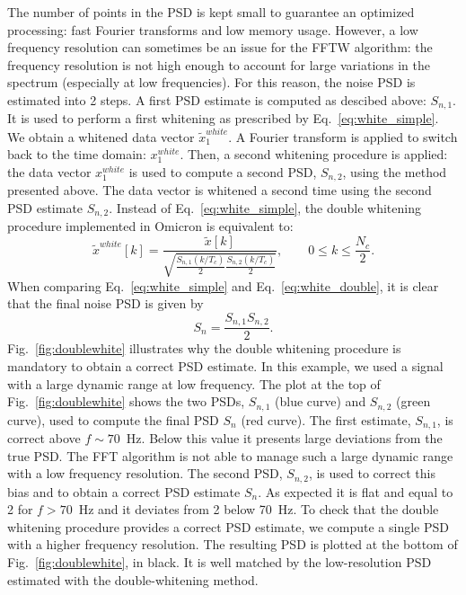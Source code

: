 The number of points in the PSD is kept small to guarantee an optimized processing: fast Fourier transforms and low memory usage. However, a low frequency resolution can sometimes be an issue for the FFTW algorithm: the frequency resolution is not high enough to account for large variations in the spectrum (especially at low frequencies). For this reason, the noise PSD is estimated into 2 steps. A first PSD estimate is computed as descibed above: $S_{n,1}$. It is used to perform a first whitening as prescribed by Eq.~\ref{eq:white_simple}. We obtain a whitened data vector $\tilde{x}_1^{white}$. A Fourier transform is applied to switch back to the time domain: $x_1^{white}$. Then, a second whitening procedure is applied: the data vector $x_1^{white}$ is used to compute a second PSD, $S_{n,2}$, using the method presented above. The data vector is whitened a second time using the second PSD estimate $S_{n,2}$. Instead of Eq.~\ref{eq:white_simple}, the double whitening procedure implemented in Omicron is equivalent to:
\begin{equation}
  \tilde{x}^{white}[k] = \frac{\tilde{x}[k]}{\sqrt{\frac{S_{n,1}(k/T_c)}{2}\frac{S_{n,2}(k/T_c)}{2}}}, \qquad 0 \le k \le \frac{N_c}{2}.
  \label{eq:white_double}
\end{equation}
When comparing Eq.~\ref{eq:white_simple} and Eq.~\ref{eq:white_double}, it is clear that the final noise PSD is given by
\begin{equation}
  S_n = \frac{S_{n,1}S_{n,2}}{2}.
\end{equation}
Fig.~\ref{fig:doublewhite} illustrates why the double whitening procedure is mandatory to obtain a correct PSD estimate. In this example, we used a signal with a large dynamic range at low frequency. The plot at the top of Fig.~\ref{fig:doublewhite} shows the two PSDs, $S_{n,1}$ (blue curve) and $S_{n,2}$ (green curve), used to compute the final PSD $S_n$ (red curve). The first estimate, $S_{n,1}$, is correct above $f\sim 70$~Hz. Below this value it presents large deviations from the true PSD. The FFT algorithm is not able to manage such a large dynamic range with a low frequency resolution. The second PSD, $S_{n,2}$, is used to correct this bias and to obtain a correct PSD estimate $S_n$. As expected it is flat and equal to 2 for $f>70$~Hz and it deviates from 2 below 70~Hz. To check that the double whitening procedure provides a correct PSD estimate, we compute a single PSD with a higher frequency resolution. The resulting PSD is plotted at the bottom of Fig.~\ref{fig:doublewhite}, in black. It is well matched by the low-resolution PSD estimated with the double-whitening method.
